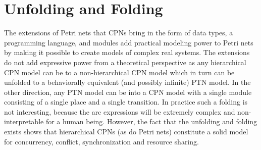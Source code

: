 \section{Unfolding and Folding}

The extensions of Petri nets that CPNs bring in the form of data
types, a programming language, and modules add practical modeling
power to Petri nets by making it possible to create models of complex
real systems. The extensions do not add expressive power from a
theoretical perspective as any hierarchical CPN model can be
 to a non-hierarchical CPN model which in turn can
be unfolded to a behaviorally equivalent (and possibly infinite) PTN
model. In the other direction, any PTN model can be 
into a CPN model with a single module consisting of a single place and
a single transition. In practice such a folding is not interesting,
because the arc expressions will be extremely complex and
non-interpretable for a human being. However, the fact that the
unfolding and folding exists shows that hierarchical CPNs (as do Petri
nets) constitute a solid model for concurrency, conflict,
synchronization and resource sharing.




